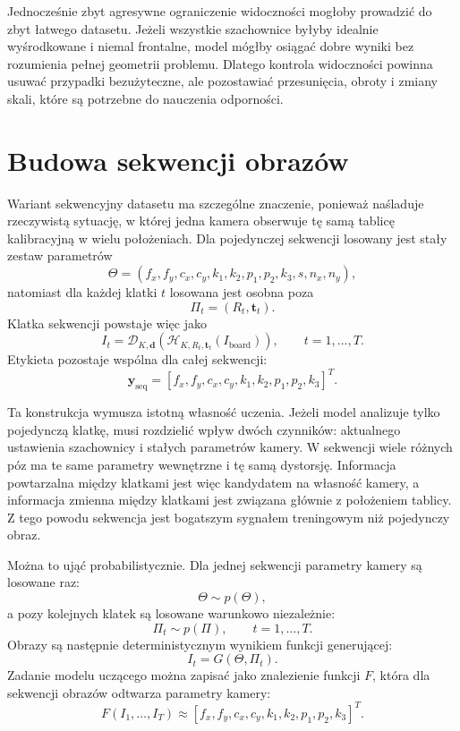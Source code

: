 \documentclass[12pt,a4paper]{report}
\begin{document}
Jednocześnie zbyt agresywne ograniczenie widoczności mogłoby prowadzić do zbyt łatwego datasetu.
Jeżeli wszystkie szachownice byłyby idealnie wyśrodkowane i niemal frontalne, model mógłby
osiągać dobre wyniki bez rozumienia pełnej geometrii problemu. Dlatego kontrola widoczności
powinna usuwać przypadki bezużyteczne, ale pozostawiać przesunięcia, obroty i zmiany skali,
które są potrzebne do nauczenia odporności.

\section{Budowa sekwencji obrazów}
Wariant sekwencyjny datasetu ma szczególne znaczenie, ponieważ naśladuje rzeczywistą sytuację,
w której jedna kamera obserwuje tę samą tablicę kalibracyjną w wielu położeniach. Dla pojedynczej
sekwencji losowany jest stały zestaw parametrów
\begin{equation}
    \Theta = (f_x,f_y,c_x,c_y,k_1,k_2,p_1,p_2,k_3,s,n_x,n_y),
\end{equation}
natomiast dla każdej klatki $t$ losowana jest osobna poza
\begin{equation}
    \Pi_t = (R_t,\mathbf{t}_t).
\end{equation}
Klatka sekwencji powstaje więc jako
\begin{equation}
    I_t = \mathcal{D}_{K,\mathbf{d}}\left(\mathcal{H}_{K,R_t,\mathbf{t}_t}(I_{\text{board}})\right),
    \qquad t=1,\dots,T.
\end{equation}
Etykieta pozostaje wspólna dla całej sekwencji:
\begin{equation}
    \mathbf{y}_{\text{seq}} = [f_x,f_y,c_x,c_y,k_1,k_2,p_1,p_2,k_3]^T.
\end{equation}

Ta konstrukcja wymusza istotną własność uczenia. Jeżeli model analizuje tylko pojedynczą
klatkę, musi rozdzielić wpływ dwóch czynników: aktualnego ustawienia szachownicy i stałych
parametrów kamery. W sekwencji wiele różnych póz ma te same parametry wewnętrzne i tę samą
dystorsję. Informacja powtarzalna między klatkami jest więc kandydatem na własność kamery,
a informacja zmienna między klatkami jest związana głównie z położeniem tablicy. Z tego powodu
sekwencja jest bogatszym sygnałem treningowym niż pojedynczy obraz.

Można to ująć probabilistycznie. Dla jednej sekwencji parametry kamery są losowane raz:
\begin{equation}
    \Theta \sim p(\Theta),
\end{equation}
a pozy kolejnych klatek są losowane warunkowo niezależnie:
\begin{equation}
    \Pi_t \sim p(\Pi),
    \qquad t=1,\dots,T.
\end{equation}
Obrazy są następnie deterministycznym wynikiem funkcji generującej:
\begin{equation}
    I_t = G(\Theta,\Pi_t).
\end{equation}
Zadanie modelu uczącego można zapisać jako znalezienie funkcji $F$, która dla sekwencji obrazów
odtwarza parametry kamery:
\begin{equation}
    F(I_1,\dots,I_T) \approx [f_x,f_y,c_x,c_y,k_1,k_2,p_1,p_2,k_3]^T.
\end{equation}
\end{document}
